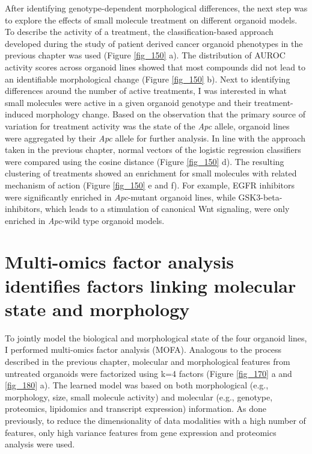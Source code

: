 \begin{flushleft}
After identifying genotype-dependent morphological differences, the next step was to explore the effects of small molecule treatment on different organoid models. To describe the activity of a treatment, the classification-based approach developed during the study of patient derived cancer organoid phenotypes in the previous chapter was used (Figure \ref{fig_150} a). The distribution of AUROC activity scores across organoid lines showed that most compounds did not lead to an identifiable morphological change (Figure \ref{fig_150} b). Next to identifying differences around the number of active treatments, I was interested in what small molecules were active in a given organoid genotype and their treatment-induced morphology change. Based on the observation that the primary source of variation for treatment activity was the state of the \textit{Apc} allele, organoid lines were aggregated by their \textit{Apc} allele for further analysis. In line with the approach taken in the previous chapter, normal vectors of the logistic regression classifiers were compared using the cosine distance (Figure \ref{fig_150} d). The resulting clustering of treatments showed an enrichment for small molecules with related mechanism of action (Figure \ref{fig_150} e and f). For example, EGFR inhibitors were significantly enriched in \textit{Apc}-mutant organoid lines, while GSK3-beta-inhibitors, which leads to a stimulation of canonical Wnt signaling, were only enriched in \textit{Apc}-wild type organoid models. 

\section{Multi-omics factor analysis identifies factors linking molecular state and morphology}

To jointly model the biological and morphological state of the four organoid lines, I performed multi-omics factor analysis (MOFA). Analogous to the process described in the previous chapter, molecular and morphological features from untreated organoids were factorized using k=4 factors (Figure \ref{fig_170} a and \ref{fig_180} a). The learned model was based on both morphological (e.g., morphology, size, small molecule activity) and molecular (e.g., genotype, proteomics, lipidomics and transcript expression) information. As done previously, to reduce the dimensionality of data modalities with a high number of features, only high variance features from gene expression and proteomics analysis were used.


\end{flushleft}
